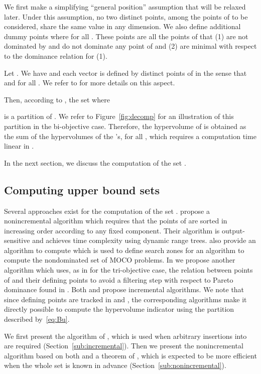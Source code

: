\documentclass[a4paper,11pt]{article}
\begin{document}
We first make a simplifying ``general position'' assumption that will be relaxed later.
Under this assumption, no two distinct points,
among the points of  to be considered,
share the same value in any dimension.
We also define additional dummy points 
where  for all .
These points are all the points of 
that (1) are not dominated by and do not dominate any point of 
 and (2) are minimal with respect to the dominance relation  for (1).

Let .
We have  and each vector 
is defined by  distinct points  of 
in the sense that  and 
for all .
We refer to \citet{KlaLacVan15} for more details on this aspect.



Then, according to 
\citet{KapRubShaVer08}, the set  where

is a partition of .
We refer to Figure~\ref{fig:decomp} for an illustration of this partition in the bi-objective case.
Therefore, the hypervolume of  is obtained as the sum of the hypervolumes of the 's,
for all , which requires a computation time linear in .


In the next section, we discuss the computation of the set .

\subsection{Computing upper bound sets}\label{sub:ubs}

Several approaches exist for the computation of the set . 
\citet{KapRubShaVer08} propose a nonincremental algorithm
which requires that the points of  are sorted 
in increasing order according to any fixed component.
Their algorithm is output-sensitive
and achieves  time complexity 
using dynamic range trees.
\citet{PrzGanEhr10} also provide an algorithm to compute 
which is used to define search zones for an algorithm to compute the nondominated
set of MOCO problems.
In \citet{KlaLacVan15} we propose another algorithm which uses, 
as in \citet{DaeKla14} for the tri-objective case,
the relation between points of  and their defining points to avoid a filtering step with respect to Pareto dominance
found in \citet{PrzGanEhr10}.
Both \citet{PrzGanEhr10} and \citet{KlaLacVan15} propose incremental algorithms.
We note that since defining points are tracked in \citet{KapRubShaVer08} and \citet{KlaLacVan15}, the corresponding algorithms
make it directly possible to compute the hypervolume indicator using the partition described by~\eqref{eq:Bu}.

We first present the algorithm of \citet{KlaLacVan15}, 
which is used
when arbitrary insertions into  are required (Section~\ref{sub:incremental}). 
Then we present the nonincremental algorithm based on both \citet{KapRubShaVer08} and a theorem of \citet{KlaLacVan15},
which is expected to be more efficient when the whole set  is known in advance
(Section~\ref{sub:nonincremental}).
\end{document}
